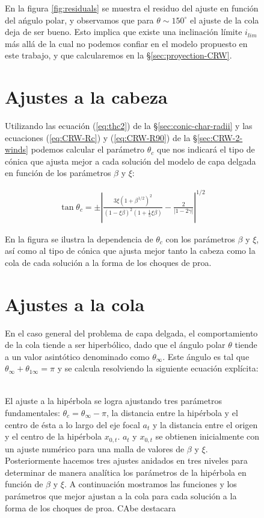 \begin{figure}
En la figura \ref{fig:residuals} se muestra el residuo del ajuste en función del ańgulo polar, y observamos que para $\theta\sim 150^\circ$ el ajuste de la cola deja de ser bueno. Esto implica que existe una inclinación límite $i_{lim}$ más allá de la cual no podemos confiar en el modelo propuesto en este trabajo, y que calcularemos en la \S \ref{sec:proyection-CRW}.

\section{Ajustes a la cabeza}

Utilizando las ecuación (\ref{eq:thc2})  de la \S \ref{sec:conic-char-radii} y las ecuaciones (\ref{eq:CRW-Rc}) y (\ref{eq:CRW-R90}) de la \S \ref{sec:CRW-2-winds} podemos calcular el parámetro $\theta_c$ que nos indicará el tipo de cónica que ajusta mejor a cada solución del modelo de capa delgada
en función de los parámetros $\beta$ y $\xi$: 

 \begin{align}
   \tan\theta_c = \pm\left|\frac{3\xi\left(1 + \beta^{1/2}\right)^2}{\left(1 - \xi\beta\right)^2
   \left(1 + \frac{1}{5}\xi\beta\right)} - \frac{2}{\left|1 - 2\gamma\right|}\right|^{1/2}
 \end{align}

 En la figura  se ilustra la dependencia de $\theta_c$ con los parámetros $\beta$ y $\xi$, así como al tipo de cónica que ajusta mejor tanto la cabeza como la cola de cada solución a la forma de los choques de proa.
 
 \section{Ajustes a la cola}
\label{sec:tail-fit}
 En el caso general del problema de capa delgada, el comportamiento de la cola tiende a ser hiperbólico, dado que
 el ángulo polar $\theta$ tiende a un valor asintótico denominado como $\theta_\infty$. Este ángulo es tal que
 $\theta_\infty + \theta_{1\infty} = \pi$ y se calcula resolviendo la siguiente ecuación explícita:

 \begin{align}
   
 \end{align}

 El ajuste a la hipérbola se logra ajustando tres parámetros fundamentales: $\theta_c = \theta_\infty - \pi$, la distancia entre la hipérbola y el centro de ésta a lo largo del eje focal $a_t$ y la distancia entre el origen y el centro de la hipérbola $x_{0,t}$. $a_t$ y $x_{0,t}$ se obtienen inicialmente con un ajuste numérico para una malla de valores de $\beta$ y $\xi$. Posteriormente hacemos tres ajustes anidados en tres niveles para determinar de manera analítica los parámetros de la hipérbola en función de $\beta$ y $\xi$. A continuación mostramos las funciones y los parámetros que mejor ajustan a la cola para cada solución a la forma de los choques de proa. CAbe destacara


\end{figure}
